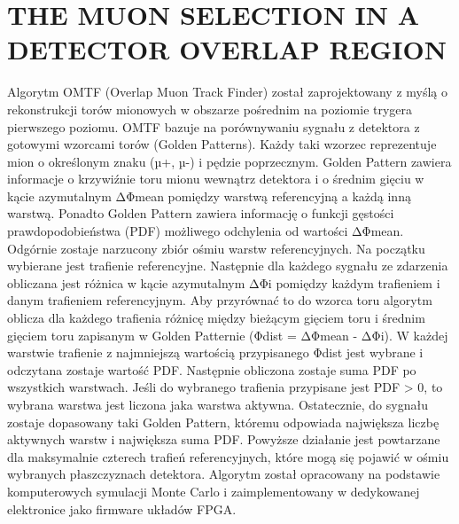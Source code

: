 \section{THE MUON SELECTION IN A DETECTOR OVERLAP REGION}

Algorytm OMTF (Overlap Muon Track Finder) został zaprojektowany z myślą o rekonstrukcji torów mionowych w obszarze pośrednim na poziomie trygera pierwszego poziomu. OMTF bazuje na porównywaniu sygnału z detektora z gotowymi wzorcami torów (Golden Patterns). Każdy taki wzorzec reprezentuje mion o określonym znaku (µ+, µ-) i pędzie poprzecznym. Golden Pattern zawiera informacje o krzywiźnie toru mionu wewnątrz detektora i o średnim gięciu w kącie azymutalnym ΔΦmean pomiędzy warstwą referencyjną a każdą inną warstwą. Ponadto Golden Pattern zawiera informację o funkcji gęstości prawdopodobieństwa (PDF) możliwego odchylenia od wartości ΔΦmean.
Odgórnie zostaje narzucony zbiór ośmiu warstw referencyjnych. Na początku wybierane jest trafienie referencyjne. Następnie dla każdego sygnału ze zdarzenia obliczana jest różnica w kącie azymutalnym ΔΦi pomiędzy każdym trafieniem i danym trafieniem referencyjnym. Aby przyrównać to do wzorca toru algorytm oblicza dla każdego trafienia różnicę między bieżącym gięciem toru i średnim gięciem toru zapisanym w Golden Patternie (Φdist = ΔΦmean - ΔΦi). W każdej warstwie trafienie z najmniejszą wartością przypisanego Φdist jest wybrane i odczytana zostaje wartość PDF. Następnie obliczona zostaje suma PDF po wszystkich warstwach. Jeśli do wybranego trafienia przypisane jest PDF > 0, to wybrana warstwa jest liczona jaka warstwa aktywna. Ostatecznie, do sygnału zostaje dopasowany taki Golden Pattern, któremu odpowiada największa liczbę aktywnych warstw i największa suma PDF. Powyższe działanie jest powtarzane dla maksymalnie czterech trafień referencyjnych, które mogą się pojawić w ośmiu wybranych płaszczyznach detektora. Algorytm został opracowany na podstawie komputerowych symulacji Monte Carlo i zaimplementowany w dedykowanej elektronice jako firmware układów FPGA.

\cite{OMTF-Wilga2014}

